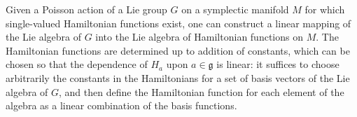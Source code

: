 Given a Poisson action of a Lie group $G$ on a symplectic manifold $M$ for which single-valued Hamiltonian functions exist, one can construct a linear mapping of the Lie algebra of $G$ into the Lie algebra of Hamiltonian functions on $M$. The Hamiltonian functions are determined up to addition of constants, which can be chosen so that the dependence of $H_a$ upon $a \in \mathfrak{g}$ is linear: it suffices to choose arbitrarily the constants in the Hamiltonians for a set of basis vectors of the Lie algebra of $G$, and then define the Hamiltonian function for each element of the algebra as a linear combination of the basis functions.
